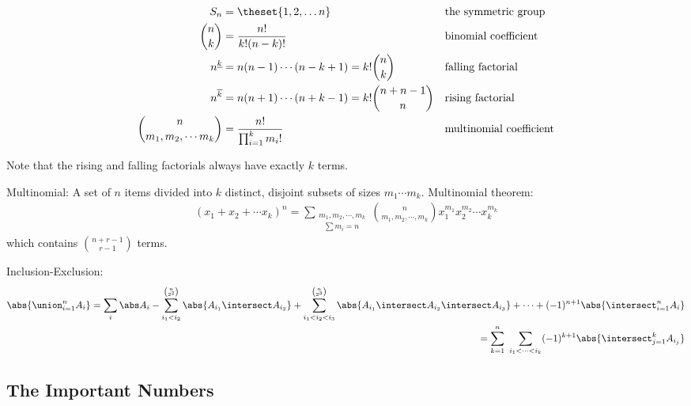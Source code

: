 \begin{align*}
S_n                                & = \theset{1,2,\ldots n}                                   &  & \text{the symmetric group} \\
{n\choose k}                       & = \frac{n!}{k!(n-k)!}                                     &  & \text{binomial coefficient}\\
n^{\underline k}                   & = n(n-1) \cdots (n-k+1) = k!{n\choose k}                  &  & \text{falling factorial}\\
n^{\overline k}                    & = n(n+1) \cdots (n+k-1) = k!{n + n - 1 \choose n}         &  & \text{rising factorial}\\
{n \choose {m_1, m_2, \cdots m_k}} & = \frac{n!}{\prod_{i=1}^k m_i!}                           &  & \text{multinomial coefficient}
\end{align*}

Note that the rising and falling factorials always have exactly \(k\)
terms.

Multinomial: A set of \(n\) items divided into \(k\) distinct, disjoint
subsets of sizes \(m_1 \cdots m_k\). Multinomial theorem:
\begin{align*}
(x_1 + x_2 + \cdots x_k )^n 
= \sum_{\substack{m_1, m_2, \cdots, m_k \\ ~~~\sum m_i = n}} 
{n \choose m_1,m_2,\cdots, m_k}
x_1^{m_1}x_2^{m_2}\cdots x_k^{m_k}
\end{align*} which contains \(n + r - 1 \choose r - 1\) terms.

Inclusion-Exclusion:
\begin{align*}
\abs{\union_{i=1}^n A_i} 
= \sum_i \abs A_i - \sum_{i_1 < i_2}^{n\choose 2^2} \abs{A_{i_1} \intersect A_{i_2}} + 
\sum_{i_1 < i_2 < i_3}^{n \choose 2^3} \abs{A_{i_1} \intersect A_{i_2} \intersect A_{i_3}} + 
\cdots +(-1)^{n+1} \abs{\intersect_{i=1}^n A_i} \\ 
= \sum_{k=1}^n ~\sum_{i_1 < \cdots < i_k}  (-1)^{k+1} \abs{\intersect_{j=1}^k A_{i_j}}
\end{align*}

\hypertarget{the-important-numbers}{%
\subsection{The Important Numbers}\label{the-important-numbers}}


